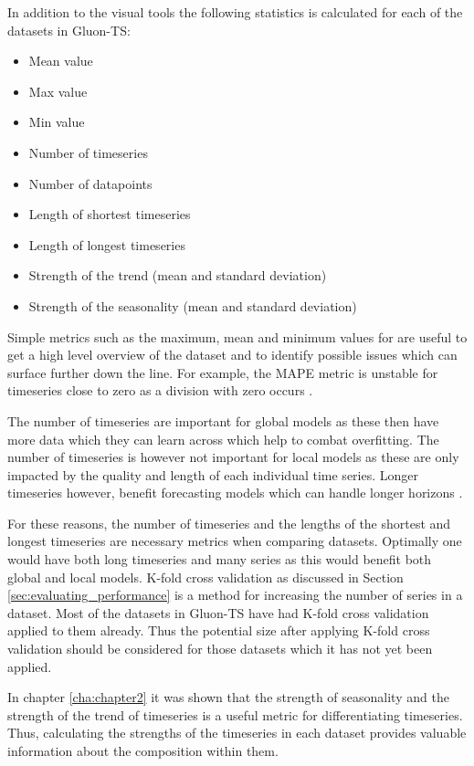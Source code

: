 In addition to the visual tools the following statistics is calculated for each of the datasets in Gluon-TS:

\begin{itemize}
    \item Mean value
    \item Max value
    \item Min value
    \item Number of timeseries
    \item Number of datapoints
    \item Length of shortest timeseries
    \item Length of longest timeseries
    \item Strength of the trend (mean and standard deviation)
    \item Strength of the seasonality (mean and standard deviation)
\end{itemize}

Simple metrics such as the maximum, mean and minimum values for are useful to get a high level overview of the dataset and to identify possible issues which can surface further down the line. For example, the MAPE metric is unstable for timeseries close to zero as a division with zero occurs \cite{hyndman_forecasting_3rd}.

The number of timeseries are important for global models as these then have more data which they can learn across which help to combat overfitting. The number of timeseries is however not important for local models as these are only impacted by the quality and length of each individual time series. Longer timeseries however, benefit forecasting models which can handle longer horizons \cite{makridakis_m4_2020}.

For these reasons, the number of timeseries and the lengths of the shortest and longest timeseries are necessary metrics when comparing datasets. Optimally one would have both long timeseries and many series as this would benefit both global and local models. K-fold cross validation as discussed in Section \ref{sec:evaluating_performance} is a method for increasing the number of series in a dataset. Most of the datasets in Gluon-TS have had K-fold cross validation applied to them already. Thus the potential size after applying K-fold cross validation should be considered for those datasets which it has not yet been applied.

In chapter \ref{cha:chapter2} it was shown that the strength of seasonality and the strength of the trend of timeseries is a useful metric for differentiating timeseries. Thus, calculating the strengths of the timeseries in each dataset provides valuable information about the composition within them.

